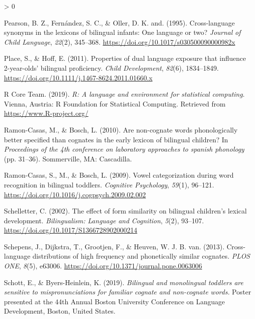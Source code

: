 \documentclass[
  english,
  ,man,floatsintext]{apa6}
\newlength{\cslhangindent}
\newenvironment{CSLReferences}[2] %
 {%
  \setlength{\parindent}{0pt}
  \ifodd #1 \everypar{\setlength{\hangindent}{\cslhangindent}}\ignorespaces\fi
  \ifnum #2 > 0
  \setlength{\parskip}{#2\baselineskip}
  \fi
 }%
 {}
\begin{document}
\begin{CSLReferences}{1}{0}
\leavevmode\hypertarget{ref-Pearson_etal_1995}{}%
Pearson, B. Z., Fernández, S. C., \& Oller, D. K. and. (1995). Cross-language synonyms in the lexicons of bilingual infants: One language or two? \emph{Journal of Child Language}, \emph{22}(2), 345--368. \url{https://doi.org/10.1017/s030500090000982x}

\leavevmode\hypertarget{ref-Place_Hoff_2011}{}%
Place, S., \& Hoff, E. (2011). Properties of dual language exposure that influence 2-year-olds' bilingual proficiency. \emph{Child Development}, \emph{82}(6), 1834--1849. \url{https://doi.org/10.1111/j.1467-8624.2011.01660.x}

\leavevmode\hypertarget{ref-R_2019}{}%
R Core Team. (2019). \emph{R: A language and environment for statistical computing}. Vienna, Austria: R Foundation for Statistical Computing. Retrieved from \url{https://www.R-project.org/}

\leavevmode\hypertarget{ref-Ramon-Casas_Bosch_2010}{}%
Ramon-Casas, M., \& Bosch, L. (2010). Are non-cognate words phonologically better specified than cognates in the early lexicon of bilingual children? In \emph{Proceedings of the 4th conference on laboratory approaches to spanish phonology} (pp. 31--36). Sommerville, MA: Cascadilla.

\leavevmode\hypertarget{ref-Ramon-Casas_etal_2009}{}%
Ramon-Casas, S., M., \& Bosch, L. (2009). Vowel categorization during word recognition in bilingual toddlers. \emph{Cognitive Psychology}, \emph{59}(1), 96--121. \url{https://doi.org/10.1016/j.cogpsych.2009.02.002}

\leavevmode\hypertarget{ref-Schelletter_2002}{}%
Schelletter, C. (2002). The effect of form similarity on bilingual children's lexical development. \emph{Bilingualism: Language and Cognition}, \emph{5}(2), 93--107. \url{https://doi.org/10.1017/S1366728902000214}

\leavevmode\hypertarget{ref-Schepens_etal_2013}{}%
Schepens, J., Dijkstra, T., Grootjen, F., \& Heuven, W. J. B. van. (2013). Cross-language distributions of high frequency and phonetically similar cognates. \emph{PLOS ONE}, \emph{8}(5), e63006. \url{https://doi.org/10.1371/journal.pone.0063006}

\leavevmode\hypertarget{ref-Schott_Byers-Heinlein_2019}{}%
Schott, E., \& Byers-Heinlein, K. (2019). \emph{Bilingual and monolingual toddlers are sensitive to mispronunciations for familiar cognate and non-cognate words.} Poster presented at the 44th Annual Boston University Conference on Language Development, Boston, United States.


\end{CSLReferences}
\end{document}
